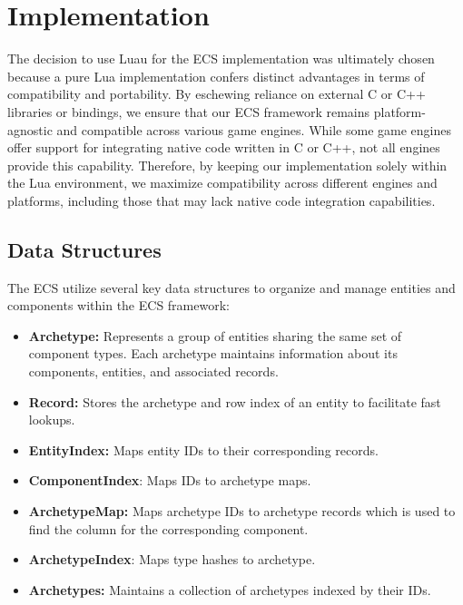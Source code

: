 \documentclass[openany, amssymb, psamsfonts]{amsart}
\theoremstyle{definition}
\numberwithin{equation}{section}
\begin{document}
\section{Implementation}
The decision to use Luau\cite{Luau} for the ECS implementation was ultimately chosen because
a pure Lua implementation confers distinct advantages in terms 
of compatibility and portability. By eschewing reliance on external C or C++ libraries 
or bindings, we ensure that our ECS framework remains platform-agnostic and 
compatible across various game engines. While some game engines offer support 
for integrating native code written in C or C++, not all engines provide this capability. 
Therefore, by keeping our implementation solely within the Lua environment, 
we maximize compatibility across different engines and platforms, 
including those that may lack native code integration capabilities.

\subsection{Data Structures}

The ECS utilize several key data structures to organize and manage entities and components within the ECS framework:

\begin{itemize}
    \item \textbf{Archetype:} Represents a group of entities sharing the same set of component types. Each archetype maintains information about its components, entities, and associated records. 
    
    \item \textbf{Record:} Stores the archetype and row index of an entity to facilitate fast lookups.
    
    \item \textbf{EntityIndex:} Maps entity IDs to their corresponding records.

    \item \textbf{ComponentIndex}: Maps IDs to archetype maps. 

    \item \textbf{ArchetypeMap:} Maps archetype IDs to archetype records which is used to find the column for the corresponding component.

    \item \textbf{ArchetypeIndex}: Maps type hashes to archetype. 
    
    \item \textbf{Archetypes:} Maintains a collection of archetypes indexed by their IDs.
\end{itemize}
\end{document}
